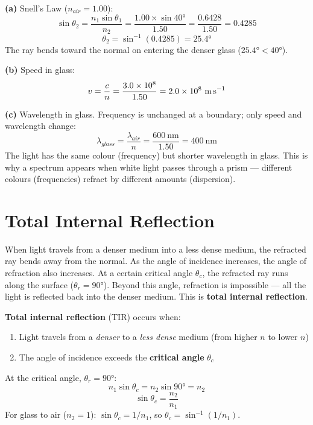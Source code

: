\begin{solutionbox}
\textbf{(a)} Snell's Law ($n_{air} = 1.00$):
\[
  \sin\theta_2 = \frac{n_1\sin\theta_1}{n_2}
  = \frac{1.00 \times \sin 40°}{1.50}
  = \frac{0.6428}{1.50} = 0.4285
\]
\[
  \theta_2 = \sin^{-1}(0.4285) = 25.4°
\]
The ray bends toward the normal on entering the
denser glass ($25.4° < 40°$).

\textbf{(b)} Speed in glass:
\[
  v = \frac{c}{n} = \frac{3.0\times10^8}{1.50}
  = 2.0\times10^8\ \text{m\,s}^{-1}
\]

\textbf{(c)} Wavelength in glass. Frequency is
unchanged at a boundary; only speed and wavelength change:
\[
  \lambda_{glass} = \frac{\lambda_{air}}{n}
  = \frac{600\ \text{nm}}{1.50} = 400\ \text{nm}
\]
The light has the same colour (frequency) but shorter
wavelength in glass. This is why a spectrum appears
when white light passes through a prism --- different
colours (frequencies) refract by different amounts
(dispersion).
\end{solutionbox}

\section{Total Internal Reflection}

When light travels from a denser medium into a less
dense medium, the refracted ray bends away from the
normal. As the angle of incidence increases, the
angle of refraction also increases. At a certain
critical angle $\theta_c$, the refracted ray runs
along the surface ($\theta_r = 90°$). Beyond this
angle, refraction is impossible --- all the light is
reflected back into the denser medium. This is
\textbf{total internal reflection}.

\begin{definitionbox}
\textbf{Total internal reflection} (TIR) occurs when:
\begin{enumerate}[noitemsep]
  \item Light travels from a \textit{denser} to a
  \textit{less dense} medium (from higher $n$ to
  lower $n$)
  \item The angle of incidence exceeds the
  \textbf{critical angle} $\theta_c$
\end{enumerate}

At the critical angle, $\theta_r = 90°$:
\[
  n_1\sin\theta_c = n_2\sin 90° = n_2
\]
\[
  \boxed{\sin\theta_c = \frac{n_2}{n_1}}
\]
For glass to air ($n_2 = 1$):
$\sin\theta_c = 1/n_1$, so $\theta_c
= \sin^{-1}(1/n_1)$.
\end{definitionbox}

